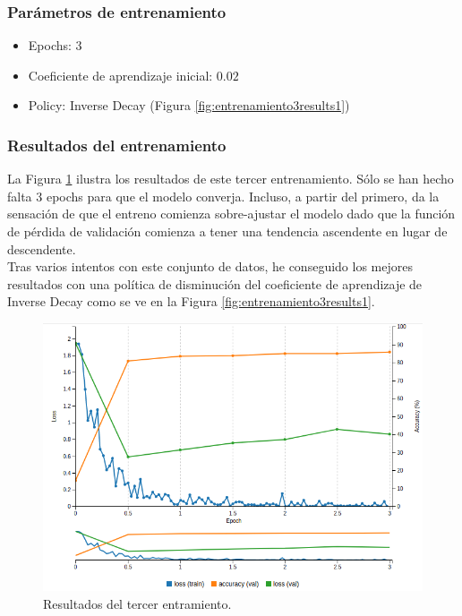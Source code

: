 \documentclass[a4paper,11pt]{book}
\begin{document}
\subsubsection{Parámetros de entrenamiento}

\begin{itemize}
	\item Epochs: \(3\)
	\item Coeficiente de aprendizaje inicial: \(0.02\)
	\item Policy: Inverse Decay (Figura \ref{fig:entrenamiento3results1})
\end{itemize}

\subsubsection{Resultados del entrenamiento}
La Figura \ref{fig:entrenamiento3results} ilustra los resultados de este tercer entrenamiento. Sólo se han hecho falta 3 epochs para que el modelo converja. Incluso, a partir del primero, da la sensación de que el entreno comienza sobre-ajustar el modelo dado que la función de pérdida de validación comienza a tener una tendencia ascendente en lugar de descendente.\\
Tras varios intentos con este conjunto de datos, he conseguido los mejores resultados con una política de disminución del coeficiente de aprendizaje de Inverse Decay como se ve en la Figura \ref{fig:entrenamiento3results1}.\\

\begin{figure}[h]
	\centering
	\includegraphics[width=0.9\linewidth]{imagenes/entrenamiento3results}
	\caption[Resultados del entrenamiento 3]{Resultados del tercer entramiento.}
	\label{fig:entrenamiento3results}
\end{figure}
\end{document}
